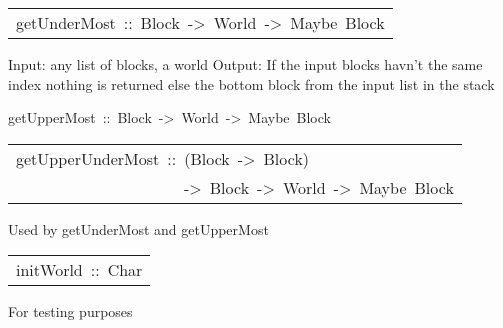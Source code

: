 \begin{haddockdesc}
\item[\begin{tabular}{@{}l}
getUnderMost\ ::\ {\char 91}Block{\char 93}\ ->\ World\ ->\ Maybe\ Block
\end{tabular}]\haddockbegindoc
Input: any list of blocks, a world
  Output: If the input blocks havn't the same index nothing is returned else the bottom block from the 
        input list in the stack  
\par

\end{haddockdesc}
\begin{haddockdesc}
\item[
getUpperMost\ ::\ {\char 91}Block{\char 93}\ ->\ World\ ->\ Maybe\ Block
]
\end{haddockdesc}
\begin{haddockdesc}
\item[\begin{tabular}{@{}l}
getUpperUnderMost\ ::\ ({\char 91}Block{\char 93}\ ->\ Block)\\\ \ \ \ \ \ \ \ \ \ \ \ \ \ \ \ \ \ \ \ \ ->\ {\char 91}Block{\char 93}\ ->\ World\ ->\ Maybe\ Block
\end{tabular}]\haddockbegindoc
Used by getUnderMost and getUpperMost 
\par

\end{haddockdesc}
\begin{haddockdesc}
\item[\begin{tabular}{@{}l}
initWorld\ ::\ {\char 91}{\char 91}{\char 91}Char{\char 93}{\char 93}{\char 93}
\end{tabular}]\haddockbegindoc
For testing purposes 
\par

\end{haddockdesc}